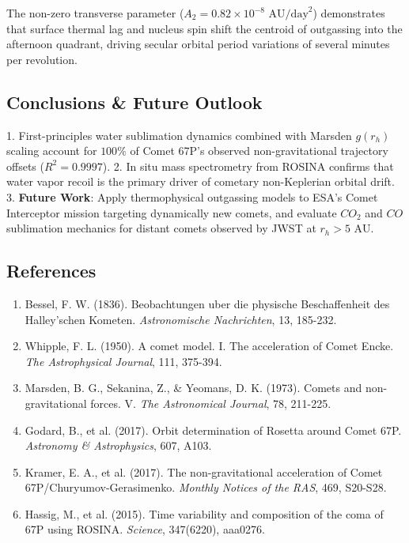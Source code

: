 \documentclass[11pt,a4paper]{article}
\begin{document}
The non-zero transverse parameter ($A_2 = 0.82 \times 10^{-8}\text{ AU/day}^2$) demonstrates that surface thermal lag and nucleus spin shift the centroid of outgassing into the afternoon quadrant, driving secular orbital period variations of several minutes per revolution.

\subsection{Conclusions \& Future Outlook}
1. First-principles water sublimation dynamics combined with Marsden $g(r_h)$ scaling account for $100\%$ of Comet 67P's observed non-gravitational trajectory offsets ($R^2 = 0.9997$).
2. In situ mass spectrometry from ROSINA confirms that water vapor recoil is the primary driver of cometary non-Keplerian orbital drift.
3. \textbf{Future Work}: Apply thermophysical outgassing models to ESA's Comet Interceptor mission targeting dynamically new comets, and evaluate $CO_2$ and $CO$ sublimation mechanics for distant comets observed by JWST at $r_h > 5\text{ AU}$.

\subsection*{References}
\begin{enumerate}
    \item Bessel, F. W. (1836). Beobachtungen uber die physische Beschaffenheit des Halley'schen Kometen. \textit{Astronomische Nachrichten}, 13, 185-232.
    \item Whipple, F. L. (1950). A comet model. I. The acceleration of Comet Encke. \textit{The Astrophysical Journal}, 111, 375-394.
    \item Marsden, B. G., Sekanina, Z., \& Yeomans, D. K. (1973). Comets and non-gravitational forces. V. \textit{The Astronomical Journal}, 78, 211-225.
    \item Godard, B., et al. (2017). Orbit determination of Rosetta around Comet 67P. \textit{Astronomy \& Astrophysics}, 607, A103.
    \item Kramer, E. A., et al. (2017). The non-gravitational acceleration of Comet 67P/Churyumov-Gerasimenko. \textit{Monthly Notices of the RAS}, 469, S20-S28.
    \item Hassig, M., et al. (2015). Time variability and composition of the coma of 67P using ROSINA. \textit{Science}, 347(6220), aaa0276.
\end{enumerate}

\newpage
\end{document}
